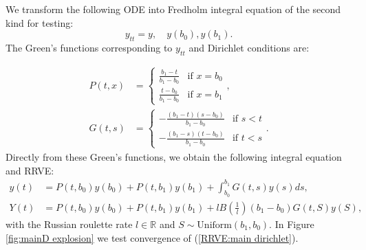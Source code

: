 \documentclass[a4paper,12pt]{article}
\begin{document}
\begin{example}[Dirichlet $y_{tt}=y$] \label{main dirichlet}
    We transform the following ODE into Fredholm integral equation of
    the second kind for testing:
    \begin{equation} \label{eq:main dirichlet}
        y_{tt}=y, \quad y(b_{0}),y(b_{1}).
    \end{equation}
    The Green's functions corresponding to $y_{tt}$ and Dirichlet conditions are:

    \begin{align}
        P(t,x) & = \begin{cases}
                       \frac{b_{1}-t}{b_{1}-b_{0}} & \text{if } x = b_{0} \\
                       \frac{t-b_{0}}{b_{1}-b_{0}} & \text{if } x = b_{1}
                   \end{cases},       \\
        G(t,s) & = \begin{cases}
                       -\frac{(b_{1}-t)(s-b_{0})}{b_{1}-b_{0}} & \text{if } s<t \\
                       -\frac{(b_{1}-s)(t-b_{0})}{b_{1}-b_{0}} & \text{if } t<s
                   \end{cases}.
    \end{align}
    Directly from these Green's functions, we obtain the following integral equation and RRVE:
    \begin{align} \label{inteq:main dirichlet}
        y(t) & = P(t,b_{0}) y(b_{0}) + P(t,b_{1}) y(b_{1}) +
        \int_{b_{0}}^{b_{1}} G(t,s)y(s) ds,                  \\
        Y(t) & = P(t,b_{0}) y(b_{0}) + P(t,b_{1}) y(b_{1})
        + l B\left(\frac{1}{l} \right)(b_{1}-b_{0}) G(t,S)y(S) , \label{RRVE:main dirichlet}
    \end{align}
    with the Russian roulette rate $l \in \mathbb{R}$  and
    $S \sim \text{Uniform}(b_{1},b_{0})$. In Figure \ref{fig:mainD explosion}
    we test convergence of (\ref{RRVE:main dirichlet}).

\end{example}
\end{document}
